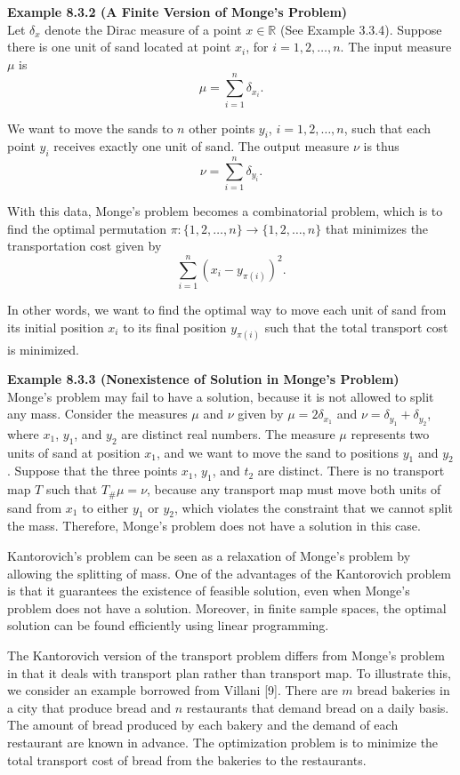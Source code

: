 \textbf{Example 8.3.2 (A Finite Version of Monge's Problem)} \\
Let $\delta_x$ denote the Dirac measure of a point $x\in \mathbb{R}$ (See Example 3.3.4). Suppose there is one unit of sand located at point $x_i$, for $i=1,2,\dots,n$. The input measure $\mu$ is
\[
\mu=\sum_{i=1}^{n} \delta_{x_i}.
\]

We want to move the sands to $n$ other points $y_i$, $i=1,2,\dots,n$, such that each point $y_i$ receives exactly one unit of sand. The output measure $\nu$ is thus
\[
\nu=\sum_{i=1}^{n} \delta_{y_i}.
\]

With this data, Monge's problem becomes a combinatorial problem, which is to find the optimal permutation $\pi:\{1,2,\dots,n\}\to \{1,2,\dots,n\}$ that minimizes the transportation cost given by
\[
\sum_{i=1}^{n} (x_i-y_{\pi(i)})^2.
\]

In other words, we want to find the optimal way to move each unit of sand from its initial position $x_i$ to its final position $y_{\pi(i)}$ such that the total transport cost is minimized.

\textbf{Example 8.3.3 (Nonexistence of Solution in Monge's Problem)} \\
Monge's problem may fail to have a solution, because it is not allowed to split any mass. Consider the measures $\mu$ and $\nu$ given by $\mu=2\delta_{x_1}$ and $\nu=\delta_{y_1}+\delta_{y_2}$, where $x_1$, $y_1$, and $y_2$ are distinct real numbers. The measure $\mu$ represents two units of sand at position $x_1$, and we want to move the sand to positions $y_1$ and $y_2$. Suppose that the three points $x_1$, $y_1$, and $t_2$ are distinct. There is no transport map $T$ such that $T_{\#}\mu=\nu$, because any transport map must move both units of sand from $x_1$ to either $y_1$ or $y_2$, which violates the constraint that we cannot split the mass. Therefore, Monge's problem does not have a solution in this case.

Kantorovich's problem can be seen as a relaxation of Monge's problem by allowing the splitting of mass. One of the advantages of the Kantorovich problem is that it guarantees the existence of feasible solution, even when Monge's problem does not have a solution. Moreover, in finite sample spaces, the optimal solution can be found efficiently using linear programming.

The Kantorovich version of the transport problem differs from Monge's problem in that it deals with transport plan rather than transport map. To illustrate this, we consider an example borrowed from Villani [9]. There are $m$ bread bakeries in a city that produce bread and $n$ restaurants that demand bread on a daily basis. The amount of bread produced by each bakery and the demand of each restaurant are known in advance. The optimization problem is to minimize the total transport cost of bread from the bakeries to the restaurants.

